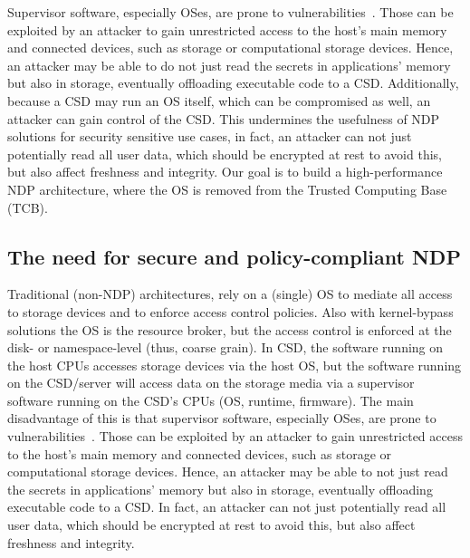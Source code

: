 Supervisor software, especially OSes, are prone to vulnerabilities~\cite{tanenbaum2006can, biggs2018jury}. %
Those can be exploited by an attacker to gain unrestricted access to the host's main memory and connected devices, such as storage or computational storage devices. Hence, an attacker may be able to do not just read the secrets in applications' memory but also in storage, eventually offloading executable code to a CSD.
Additionally, because a CSD may run an OS itself, which can be compromised as well,
an attacker can gain control of the CSD.
This undermines the usefulness of NDP solutions for security sensitive use cases, %
in fact, an attacker can not just potentially read all user data, which should be encrypted at rest to avoid this, but also affect freshness and integrity.
Our goal is to build a high-performance NDP architecture, where the OS is removed from the Trusted Computing Base (TCB).
\fi

\subsection{The need for secure and policy-compliant NDP}
Traditional (non-NDP) architectures, rely on a (single) OS to mediate all access to storage devices and to enforce access control policies. Also with kernel-bypass solutions the OS is the resource broker, but the access control is enforced at the disk- or namespace-level (thus, coarse grain). %
In CSD, the software running on the host CPUs accesses storage devices via the host OS, but the software running on the CSD/server will access data on the storage media via a supervisor software running on the CSD's CPUs (OS, runtime, firmware).
The main disadvantage of this is that supervisor software, especially OSes, are prone to vulnerabilities~\cite{tanenbaum2006can, biggs2018jury}.
Those can be exploited by an attacker to gain unrestricted access to the host's main memory and connected devices, such as storage or computational storage devices. Hence, an attacker may be able to not just read the secrets in applications' memory but also in storage, eventually offloading executable code to a CSD. In fact, an attacker can not just potentially read all user data, which should be encrypted at rest to avoid this, but also affect freshness and integrity.

